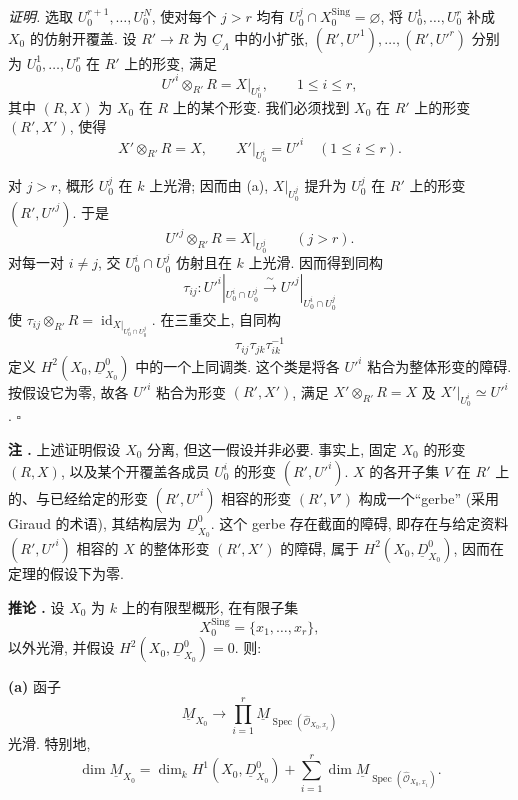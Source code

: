\smallskip
\noindent\textit{证明.}
选取 $U_0^{r+1},\ldots,U_0^N$, 使对每个 $j>r$ 均有 $U_0^j\cap X_0^{\mathrm{Sing}}=\varnothing$, 将 $U_0^1,\ldots,U_0^r$ 补成 $X_0$ 的仿射开覆盖. 设 $R'\longrightarrow R$ 为 $\underline C_\Lambda$ 中的小扩张, $(R',U'^1),\ldots,(R',U'^r)$ 分别为 $U_0^1,\ldots,U_0^r$ 在 $R'$ 上的形变, 满足
\[
U'^i\otimes_{R'}R=X|_{U_0^i},\qquad 1\leq i\leq r,
\]
其中 $(R,X)$ 为 $X_0$ 在 $R$ 上的某个形变. 我们必须找到 $X_0$ 在 $R'$ 上的形变 $(R',X')$, 使得
\[
X'\otimes_{R'}R=X,
\qquad
X'|_{U_0^i}=U'^i\quad(1\leq i\leq r).
\]


对 $j>r$, 概形 $U_0^j$ 在 $k$ 上光滑; 因而由 (a), $X|_{U_0^j}$ 提升为 $U_0^j$ 在 $R'$ 上的形变 $(R',U'^j)$. 于是
\[
U'^j\otimes_{R'}R=X|_{U_0^j}\qquad(j>r).
\]
对每一对 $i\neq j$, 交 $U_0^i\cap U_0^j$ 仿射且在 $k$ 上光滑. 因而得到同构
\[
\tau_{ij}:U'^i|_{U_0^i\cap U_0^j}
\xrightarrow{\ \sim\ }
U'^j|_{U_0^i\cap U_0^j}
\]
使 $\tau_{ij}\otimes_{R'}R=\operatorname{id}_{X|_{U_0^i\cap U_0^j}}$. 在三重交上, 自同构
\[
\tau_{ij}\tau_{jk}\tau_{ik}^{-1}
\]
定义 $H^2(X_0,\underline D^0_{X_0})$ 中的一个上同调类. 这个类是将各 $U'^i$ 粘合为整体形变的障碍. 按假设它为零, 故各 $U'^i$ 粘合为形变 $(R',X')$, 满足 $X'\otimes_{R'}R=X$ 及 $X'|_{U_0^i}\simeq U'^i$. \hfill$\square$

\medskip
\noindent\textbf{注 .}
上述证明假设 $X_0$ 分离, 但这一假设并非必要. 事实上, 固定 $X_0$ 的形变 $(R,X)$, 以及某个开覆盖各成员 $U_0^i$ 的形变 $(R',U'^i)$. $X$ 的各开子集 $V$ 在 $R'$ 上的、与已经给定的形变 $(R',U'^i)$ 相容的形变 $(R',V')$ 构成一个“gerbe” (采用 Giraud 的术语), 其结构层为 $\underline D^0_{X_0}$. 这个 gerbe 存在截面的障碍, 即存在与给定资料 $(R',U'^i)$ 相容的 $X$ 的整体形变 $(R',X')$ 的障碍, 属于 $H^2(X_0,\underline D^0_{X_0})$, 因而在定理的假设下为零.



\medskip
\noindent\textbf{推论 .}
设 $X_0$ 为 $k$ 上的有限型概形, 在有限子集
\[
X_0^{\mathrm{Sing}}=\{x_1,\ldots,x_r\},
\]
以外光滑, 并假设 $H^2(X_0,\underline D^0_{X_0})=0$. 则:

\smallskip
\noindent\textbf{(a)} 函子
\[
\underline M_{X_0}\longrightarrow
\prod_{i=1}^r
\underline M_{\operatorname{Spec}(\widehat{\mathcal O}_{X_0,x_i})}
\]
光滑. 特别地,
\[
\dim\underline M_{X_0}
=\dim_k H^1(X_0,\underline D^0_{X_0})
+\sum_{i=1}^r
\dim\underline M_{\operatorname{Spec}(\widehat{\mathcal O}_{X_0,x_i})}.
\]

